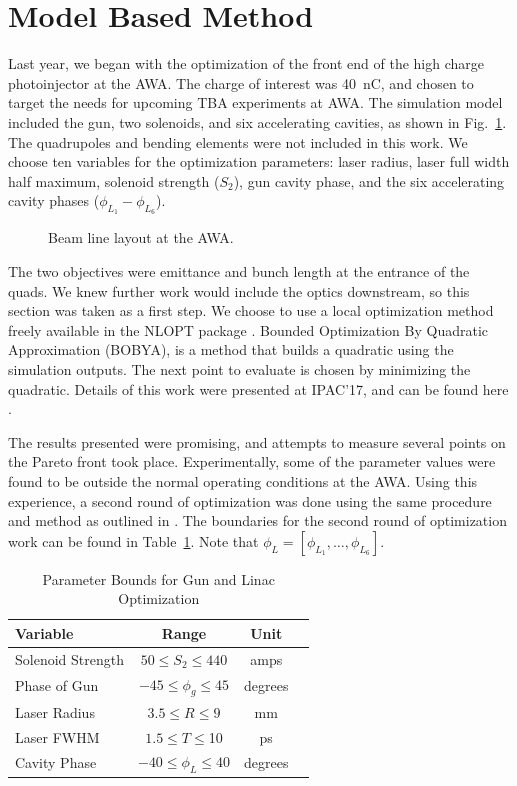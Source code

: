 \documentclass[letterpaper,  %
              ]{jacow-2_3}   %
\begin{document}
\section{Model Based Method}
Last year, we began with the optimization of the front end of 
the high charge photoinjector at the AWA. The charge
of interest was \SI{40}{nC}, and chosen to target the needs 
for upcoming TBA experiments at AWA.
The simulation model included the gun, two solenoids, 
and six accelerating cavities, as shown in Fig.~\ref{beamline}. 
The quadrupoles and bending elements were not included in this work.
We choose ten variables for the optimization parameters: 
laser radius, laser full width half maximum, solenoid strength ($S_2$), 
gun cavity phase, and the six accelerating cavity phases ($\phi_{L_1}-\phi_{L_6}$).
\begin{figure}%
	\centering
	\begin{tikzpicture}[scale=0.7, text=black]
	
	\end{tikzpicture}	
	\caption{Beam line layout at the AWA.}
	\label{beamline}
\end{figure}

The two objectives were emittance and bunch length at the 
entrance of the quads. We knew further work would include the optics
downstream, so this section was taken as a first step. 
We choose to use a local optimization method freely available in the NLOPT package \cite{nlopt}. Bounded Optimization By Quadratic Approximation (BOBYA), 
is a method that builds a quadratic using the simulation outputs. 
The next point to evaluate is chosen by minimizing the quadratic.
Details of this work were presented at IPAC'17, and can be found here \cite{denmark}. 

The results presented were promising, and attempts to measure
several points on the Pareto front took place.
Experimentally, some of the parameter values were found to 
be outside the normal operating conditions at the AWA.
Using this experience, a second round of optimization 
was done using the same procedure and method as 
outlined in \cite{denmark}. The boundaries for the second
round of optimization work can be found in Table~\ref{bounds}.
Note that $\phi_L=[\phi_{L_1},\ldots,\phi_{L_6}]$.
\begin{table} %
	\centering
	\caption{Parameter Bounds for Gun and Linac Optimization}
	\begin{tabular}{ l *{3}{c}}
		\toprule
		\textbf{Variable} & \textbf{Range} & \textbf{Unit} \\
		\midrule
		Solenoid Strength & $ 50 \le S_2 \le 440$  & amps \\
		Phase of Gun & $-45 \le \phi_g \le 45$  & degrees \\
		Laser Radius  & $3.5 \le R \le 9$  & mm \\
		Laser FWHM & $1.5 \le T \le $10  & ps \\
		Cavity Phase & $-40 \le \phi_L \le 40$  & degrees \\
		\bottomrule	
	\end{tabular}	
	\label{bounds}
\end{table}
\end{document}
